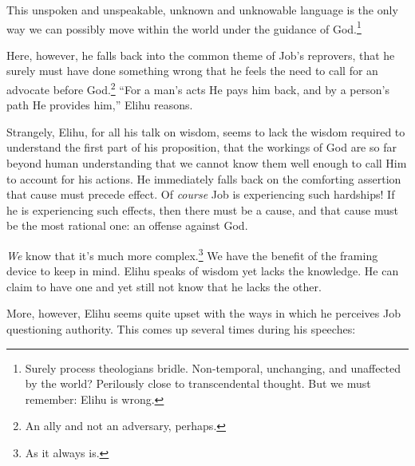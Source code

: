 This unspoken and unspeakable, unknown and unknowable language is the only way we can possibly move within the world under the guidance of God.\footnote{Surely process theologians bridle. Non-temporal, unchanging, and unaffected by the world? Perilously close to transcendental thought. But we must remember: Elihu is wrong.\footnotemark}

Here, however, he falls back into the common theme of Job's reprovers, that he surely must have done something wrong that he feels the need to call for an advocate before God.\footnote{An ally and not an adversary, perhaps.} ``For a man's acts He pays him back, and by a person's path He provides him,'' Elihu reasons.

Strangely, Elihu, for all his talk on wisdom, seems to lack the wisdom required to understand the first part of his proposition, that the workings of God are so far beyond human understanding that we cannot know them well enough to call Him to account for his actions. He immediately falls back on the comforting assertion that cause must precede effect. Of \emph{course} Job is experiencing such hardships! If he is experiencing such effects, then there must be a cause, and that cause must be the most rational one: an offense against God.

\emph{We} know that it's much more complex.\footnote{As it always is.\footnotemark} We have the benefit of the framing device to keep in mind. Elihu speaks of wisdom yet lacks the knowledge. He can claim to have one and yet still not know that he lacks the other.

More, however, Elihu seems quite upset with the ways in which he perceives Job questioning authority. This comes up several times during his speeches:

